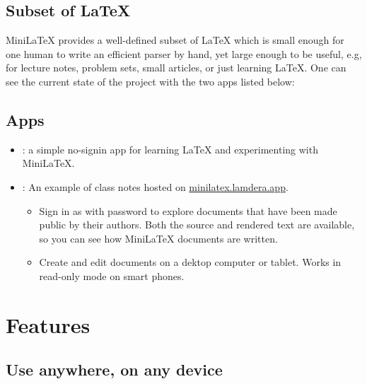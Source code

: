 \subsection{Subset of LaTeX}

MiniLaTeX provides a  well-defined subset of LaTeX which is small enough for one human to write an efficient parser by hand, yet large enough to be useful, e.g, for lecture notes, problem sets, small articles, or just learning LaTeX.  One can see the current state of the project with the two apps listed below:


\subsection{Apps}

\begin{itemize}

\item {}: a simple no-signin app for learning LaTeX and experimenting with MiniLaTeX.

\item {}:  An example of class notes hosted on
\href{https://minilatex.lamdera.app}{minilatex.lamdera.app}.

\begin{itemize}

\item {} Sign in as  with password  to explore documents that have been made public by their authors.  Both the source and rendered text are available, so you can see how MiniLaTeX documents are written.

\item {} Create and edit documents on a dektop computer or tablet. Works in read-only mode on smart phones.

\end{itemize}


\end{itemize}


\section{Features}


\subsection{Use anywhere, on any  device}

